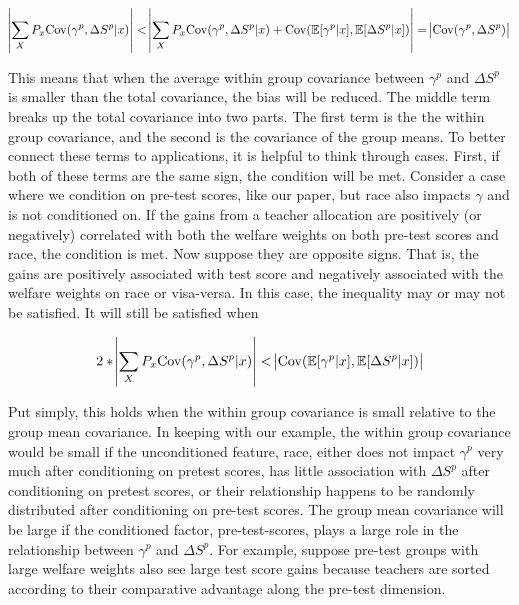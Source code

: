 \documentclass[12pt]{article}
\theoremstyle{definition}
\theoremstyle{definition}
\theoremstyle{definition}
\theoremstyle{definition}
\begin{document}
       \begin{equation}
       \label{eq:cond_ineq_cov2}
         \abs{ \sum_{X} P_x \mathrm{Cov}(\gamma^p, \Delta S^p| x) }  < \abs{ \sum_{X} P_x \mathrm{Cov}(\gamma^p, \Delta S^p| x) + \mathrm{Cov}(\mathbb{E}[\gamma^p|x], \mathbb{E}[\Delta S^p|x]) } =   \abs{ \mathrm{Cov}(\gamma^p, \Delta S^p) }
        \end{equation}


    This means that when the average within group covariance between $\gamma^p$ and $ \Delta S^p$ is smaller than the total covariance, the bias will be reduced. The middle term breaks up the total covariance into two parts. The first term is the the within group covariance, and the second is the covariance of the group means. To better connect these terms to applications, it is helpful to think through cases. First, if both of these terms are the same sign, the condition will be met. Consider a case where we condition on pre-test scores, like our paper, but race also impacts $\gamma$ and is not conditioned on. If the gains from a teacher allocation are positively (or negatively) correlated with both the welfare weights on both pre-test scores and race, the condition is met. Now suppose they are opposite signs. That is, the gains are positively associated with test score and negatively associated with the welfare weights on race or visa-versa. In this case, the inequality may or may not be satisfied. It will still be satisfied when 

         \begin{equation}
         2 * \abs{ \sum_{X} P_x \mathrm{Cov}(\gamma^p, \Delta S^p| x)} < \abs{ \mathrm{Cov}(\mathbb{E}[\gamma^p|x], \mathbb{E}[\Delta S^p|x]) }
        \end{equation}

   Put simply, this holds when the within group covariance is small relative to the group mean covariance. In keeping with our example, the within group covariance would be small if the unconditioned feature, race, either does not impact $\gamma^p$ very much after conditioning on pretest scores, has little association with $\Delta S^p$ after conditioning on pretest scores, or their relationship happens to be randomly distributed after conditioning on pre-test scores. The group mean covariance will be large if the conditioned factor, pre-test-scores, plays a large role in the relationship between $\gamma^p$ and $\Delta S^p$. For example, suppose pre-test groups with large welfare weights also see large test score gains because teachers are sorted according to their comparative advantage along the pre-test dimension. 
\end{document}
